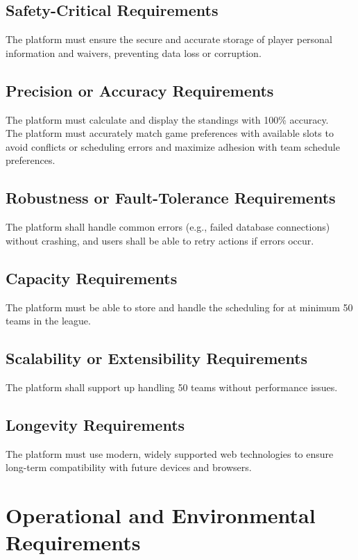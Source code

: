 \documentclass[12pt]{article}
\begin{document}
\subsection{Safety-Critical Requirements}
The platform must ensure the secure and accurate storage of player personal information and waivers, preventing data loss or corruption.

\subsection{Precision or Accuracy Requirements}
The platform must calculate and display the standings with 100\% accuracy.\\

\noindent The platform must accurately match game preferences with available slots to avoid conflicts or scheduling errors and maximize adhesion with team schedule preferences.

\subsection{Robustness or Fault-Tolerance Requirements}
The platform shall handle common errors (e.g., failed database connections) without crashing, and users shall be able to retry actions if errors occur.

\subsection{Capacity Requirements}
The platform must be able to store and handle the scheduling for at minimum 50 teams in the league.

\subsection{Scalability or Extensibility Requirements}
The platform shall support up handling 50 teams without performance issues.

\subsection{Longevity Requirements}
The platform must use modern, widely supported web technologies to ensure long-term compatibility with future devices and browsers.

\section{Operational and Environmental Requirements}
\end{document}
